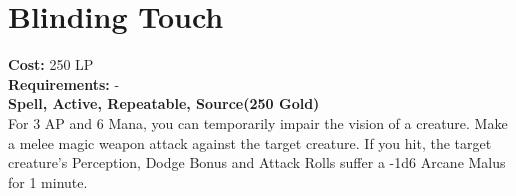 \section{Blinding Touch}\label{spell:blindingtouch}
\textbf{Cost:} 250 LP\\
\textbf{Requirements:} -\\
\textbf{Spell, Active, Repeatable, Source(250 Gold)}\\
For 3 AP and 6 Mana, you can temporarily impair the vision of a creature.
Make a melee magic weapon attack against the target creature.
If you hit, the target creature's Perception, Dodge Bonus and Attack Rolls suffer a -1d6 Arcane Malus for 1 minute.\\
